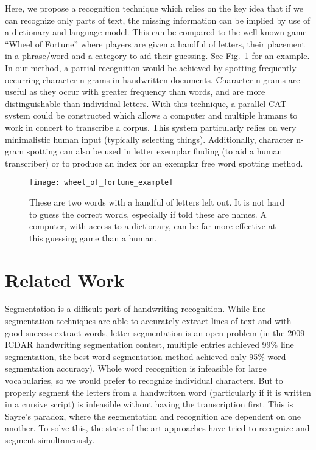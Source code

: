 \documentclass[ms]{byuprop}
\begin{document}
Here, we propose a recognition technique which relies on the key idea that if we can recognize only parts of text, the missing information can be implied by use of a dictionary and language model. This can be compared to the well known game ``Wheel of Fortune'' where players are given a handful of letters, their placement in a phrase/word and a category to aid their guessing. See Fig.~\ref{fig:wheel_of_fortune_example} for an example. In our method, a partial recognition would be achieved by spotting frequently occurring character n-grams in handwritten documents. Character n-grams are useful as they occur with greater frequency than words, and are more distinguishable than individual letters. With this technique, a parallel CAT system could be constructed which allows a computer and multiple humans to work in concert to transcribe a corpus. This system particularly relies on very minimalistic human input (typically selecting things). Additionally, character n-gram spotting can also be used in letter exemplar finding (to aid a human transcriber) or to produce an index for an exemplar free word spotting method.

\begin{figure}[h]
    \centering
    \texttt{[image: wheel\_of\_fortune\_example]}
    \caption{These are two words with a handful of letters left out. It is not hard to guess the correct words, especially if told these are names. A computer, with access to a dictionary, can be far more effective at this guessing game than a human.}
    \label{fig:wheel_of_fortune_example}
\end{figure}


\section{Related Work}

Segmentation is a difficult part of handwriting recognition. While line segmentation techniques are able to accurately extract lines of text and with good success extract words, letter segmentation is an open problem (in the 2009 ICDAR handwriting segmentation contest, multiple entries achieved 99\% line segmentation, the best word segmentation method achieved only 95\% word segmentation accuracy\cite{icdar_segmentation}). Whole word recognition is infeasible for large vocabularies, so we would prefer to recognize individual characters. But to properly segment the letters from a handwritten word (particularly if it is written in a cursive script) is infeasible without having the transcription first. This is Sayre's paradox, where the segmentation and recognition are dependent on one another.\cite{sayres} To solve this, the state-of-the-art approaches have tried to recognize and segment simultaneously.
\end{document}
